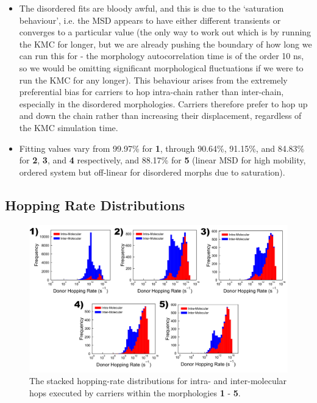 \documentclass[12pt]{article}
\begin{document}
\begin{itemize}
    \item{The disordered fits are bloody awful, and this is due to the `saturation behaviour', i.e. the MSD appears to have either different transients or converges to a particular value (the only way to work out which is by running the KMC for longer, but we are already pushing the boundary of how long we can run this for - the morphology autocorrelation time is of the order 10 ns, so we would be omitting significant morphological fluctuations if we were to run the KMC for any longer).
            This behaviour arises from the extremely preferential bias for carriers to hop intra-chain rather than inter-chain, especially in the disordered morphologies.
        Carriers therefore prefer to hop up and down the chain rather than increasing their displacement, regardless of the KMC simulation time.}
    \item{Fitting values vary from 99.97\% for \textbf{1}, through 90.64\%, 91.15\%, and 84.83\% for \textbf{2}, \textbf{3}, and \textbf{4} respectively, and 88.17\% for \textbf{5} (linear MSD for high mobility, ordered system but off-linear for disordered morphs due to saturation).} 
\end{itemize}


\subsection{Hopping Rate Distributions}

\begin{figure}[h!]\centering
	\includegraphics[width=\textwidth]{Figures/DonorHoppingRateMixed.pdf}
    \caption{The stacked hopping-rate distributions for intra- and inter-molecular hops executed by carriers within the morphologies \textbf{1} - \textbf{5}.}
	\label{fig:HoppingRateMixed}
\end{figure}
\end{document}
